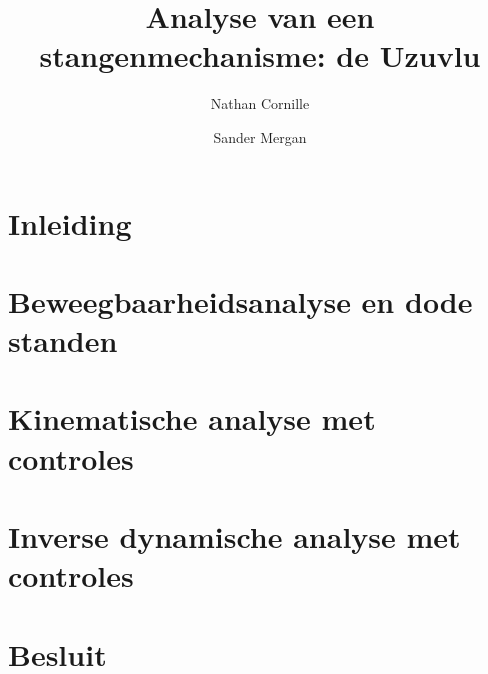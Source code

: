 \documentclass[12pt]{article}
\title{Analyse van een stangenmechanisme: de Uzuvlu}
\author{Nathan Cornille \and Sander Mergan}
\begin{document}
\maketitle
\newpage
\tableofcontents

\newpage
\section{Inleiding}\label{inleiding}

\clearpage
\section{Beweegbaarheidsanalyse en dode standen}\label{Beweegbaarheidsanalyse en dode standen}
\clearpage
\section{Kinematische analyse met controles}\label{Kinematische analyse}
\clearpage
\section{Inverse dynamische analyse met controles}\label{Dynamische analyse}
\clearpage
\section{Besluit}\label{Besluit}
\clearpage
\end{document}
